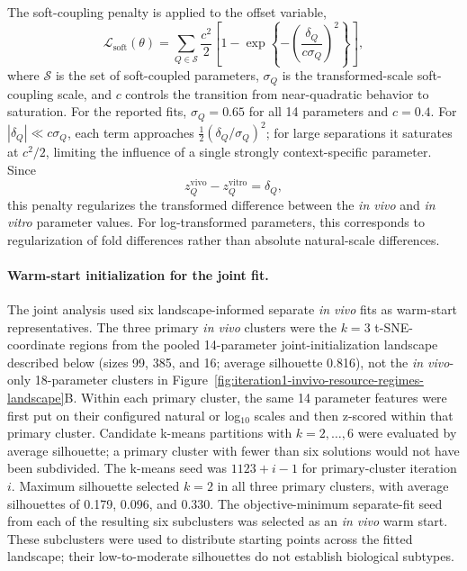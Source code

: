 \documentclass[11pt]{article}
\begin{document}
The soft-coupling penalty is applied to the offset variable,
\begin{equation}
\mathcal L_{\mathrm{soft}}(\theta)
=
\sum_{Q\in\mathcal S}
\frac{c^2}{2}
\left[
1-\exp\!\left\{
-\left(\frac{\delta_Q}{c\sigma_Q}\right)^2
\right\}
\right],
\label{eq:appendix_joint_soft_penalty}
\end{equation}
where $\mathcal S$ is the set of soft-coupled parameters, $\sigma_Q$ is the transformed-scale soft-coupling scale, and $c$ controls the transition from near-quadratic behavior to saturation. For the reported fits, $\sigma_Q=0.65$ for all 14 parameters and $c=0.4$. For $|\delta_Q|\ll c\sigma_Q$, each term approaches $\tfrac{1}{2}(\delta_Q/\sigma_Q)^2$; for large separations it saturates at $c^2/2$, limiting the influence of a single strongly context-specific parameter. Since
\[
z_Q^{\mathrm{vivo}}-z_Q^{\mathrm{vitro}}=\delta_Q,
\]
this penalty regularizes the transformed difference between the \textit{in vivo} and \textit{in vitro} parameter values. For log-transformed parameters, this corresponds to regularization of fold differences rather than absolute natural-scale differences.


\paragraph{Warm-start initialization for the joint fit.}

The joint analysis used six landscape-informed separate \textit{in vivo} fits as warm-start representatives. The three primary \textit{in vivo} clusters were the $k=3$ t-SNE-coordinate regions from the pooled 14-parameter joint-initialization landscape described below (sizes 99, 385, and 16; average silhouette 0.816), not the \textit{in vivo}-only 18-parameter clusters in Figure~\ref{fig:iteration1-invivo-resource-regimes-landscape}B. Within each primary cluster, the same 14 parameter features were first put on their configured natural or log$_{10}$ scales and then z-scored within that primary cluster. Candidate k-means partitions with $k=2,\ldots,6$ were evaluated by average silhouette; a primary cluster with fewer than six solutions would not have been subdivided. The k-means seed was $1123+i-1$ for primary-cluster iteration $i$. Maximum silhouette selected $k=2$ in all three primary clusters, with average silhouettes of 0.179, 0.096, and 0.330. The objective-minimum separate-fit seed from each of the resulting six subclusters was selected as an \textit{in vivo} warm start. These subclusters were used to distribute starting points across the fitted landscape; their low-to-moderate silhouettes do not establish biological subtypes.
\end{document}
